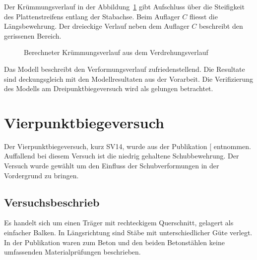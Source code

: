 \documentclass[
  11pt,
  letterpaper,
]{scrreprt}
\begin{document}
Der Krümmungsverlauf in der Abbildung~\ref{fig-chi-max-a3v2} gibt
Aufschluss über die Steifigkeit des Plattenstreifens entlang der
Stabachse. Beim Auflager \(C\) fliesst die Längsbewehrung. Der
dreieckige Verlauf neben dem Auflager \(C\) beschreibt den gerissenen
Bereich.

\begin{figure}[H]


\caption{\label{fig-chi-max-a3v2}Berechneter Krümmungsverlauf aus dem
Verdrehungsverlauf}

\end{figure}%

Das Modell beschreibt den Verformungsverlauf zufriedenstellend. Die
Resultate sind deckungsgleich mit den Modellresultaten aus der
Vorarbeit. Die Verifizierung des Modells am Dreipunktbiegeversuch wird
als gelungen betrachtet.

\newpage{}

\section{Vierpunktbiegeversuch}\label{vierpunktbiegeversuch}

Der Vierpunktbiegeversuch, kurz SV14, wurde aus der Publikation
{[}\citeproc{ref-tue_einfluss_2019}{3}{]} entnommen. Auffallend bei
diesem Versuch ist die niedrig gehaltene Schubbewehrung. Der Versuch
wurde gewählt um den Einfluss der Schubverformungen in der Vordergrund
zu bringen.

\subsection{Versuchsbeschrieb}\label{versuchsbeschrieb-1}

Es handelt sich um einen Träger mit rechteckigem Querschnitt, gelagert
als einfacher Balken. In Längsrichtung sind Stäbe mit unterschiedlicher
Güte verlegt. In der Publikation waren zum Beton und den beiden
Betonstählen keine umfassenden Materialprüfungen beschrieben.
\end{document}
